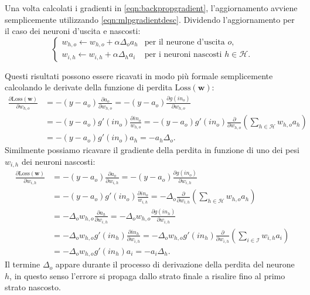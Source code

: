 \documentclass[../../main.tex]{subfiles}
\begin{document}
Una volta calcolati i gradienti in \eqref{eqn:backpropgradient}, l'aggiornamento avviene semplicemente utilizzando \eqref{eqn:mlpgradientdesc}. Dividendo l'aggiornamento per il caso dei neuroni d'uscita e nascosti:
\begin{equation}
    \begin{cases}
        w_{h,o} \leftarrow w_{h,o} + \alpha \Delta_o a_h & \text{per il neurone d'uscita } o,\\
        w_{i,h} \leftarrow w_{i,h} + \alpha \Delta_h a_i & \text{per i neuroni nascosti } h \in \mathcal{H}.
    \end{cases}
\end{equation}

Questi risultati possono essere ricavati in modo più formale semplicemente calcolando le derivate della funzione di perdita $\mathrm{Loss}(\mathbf{w})$:
\begin{equation}
    \begin{aligned}
        \frac{\partial \mathrm{Loss}(\boldsymbol{w})}{\partial w_{h,o}} &= -(y - a_o) \frac{\partial a_o}{\partial w_{h,o}} = -(y - a_o) \frac{\partial g(in_o)}{\partial w_{h,o}}\\
        & = -(y - a_o)g'(in_o)\frac{\partial in_o}{w_{h,o}} = -(y - a_o)g'(in_o) \frac{\partial}{\partial w_{h,o}}\left(\sum_{h \in \mathcal{H}} w_{h,o} a_h \right)\\
        & = -(y - a_o)g'(in_o) a_h = -a_h \Delta_o.        
    \end{aligned}
\end{equation}
Similmente possiamo ricavare il gradiente della perdita in funzione di uno dei pesi $w_{i,h}$ dei neuroni nascosti:
\begin{equation}
    \begin{aligned}
        \frac{\partial \mathrm{Loss}(\boldsymbol{w})}{\partial w_{i,h}} &= -(y - a_o) \frac{\partial a_o}{\partial w_{i,h}} = -(y - a_o) \frac{\partial g(in_o)}{\partial w_{i,h}}\\
        &= -(y - a_o)g'(in_o)\frac{\partial in_o}{w_{i,h}} = -\Delta_o \frac{\partial}{\partial w_{i,h}}\left(\sum_{h \in \mathcal{H}} w_{h,o} a_h \right) \\
        &= -\Delta_o w_{h,o} \frac{\partial a_h}{\partial w_{i,h}} = -\Delta_o w_{h,o} \frac{\partial g(in_h)}{\partial w_{i,h}} \\
        &= - \Delta_o w_{h,o} g'(in_h) \frac{\partial in_h}{\partial w_{i,h}} = -\Delta_o w_{h,o} g'(in_h) \frac{\partial}{\partial w_{i,h}} \left(\sum_{i \in \mathcal{I}} w_{i,h} a_i\right)\\
        &= -\Delta_o w_{h,o} g'(in_h) a_i = -a_i \Delta_h.
    \end{aligned}
\end{equation}
Il termine $\Delta_o$ appare durante il processo di derivazione della perdita  del neurone $h$, in questo senso l'errore si propaga dallo strato finale a risalire fino al primo strato nascosto.
\end{document}
